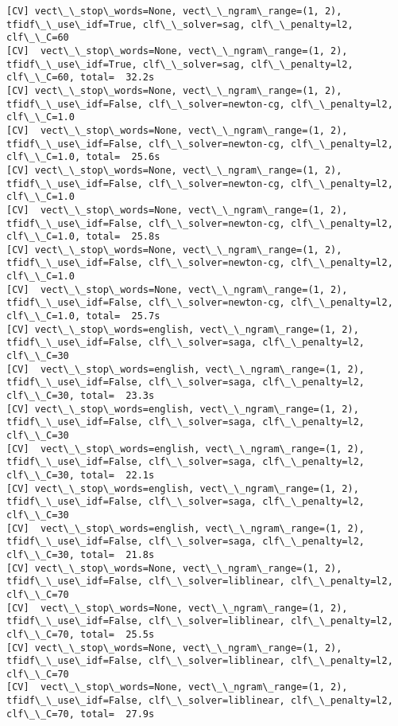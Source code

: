 \documentclass[11pt]{article}
\begin{document}
\begin{Verbatim}[commandchars=\\\{\}]
[CV] vect\_\_stop\_words=None, vect\_\_ngram\_range=(1, 2), tfidf\_\_use\_idf=True, clf\_\_solver=sag, clf\_\_penalty=l2, clf\_\_C=60 
[CV]  vect\_\_stop\_words=None, vect\_\_ngram\_range=(1, 2), tfidf\_\_use\_idf=True, clf\_\_solver=sag, clf\_\_penalty=l2, clf\_\_C=60, total=  32.2s
[CV] vect\_\_stop\_words=None, vect\_\_ngram\_range=(1, 2), tfidf\_\_use\_idf=False, clf\_\_solver=newton-cg, clf\_\_penalty=l2, clf\_\_C=1.0 
[CV]  vect\_\_stop\_words=None, vect\_\_ngram\_range=(1, 2), tfidf\_\_use\_idf=False, clf\_\_solver=newton-cg, clf\_\_penalty=l2, clf\_\_C=1.0, total=  25.6s
[CV] vect\_\_stop\_words=None, vect\_\_ngram\_range=(1, 2), tfidf\_\_use\_idf=False, clf\_\_solver=newton-cg, clf\_\_penalty=l2, clf\_\_C=1.0 
[CV]  vect\_\_stop\_words=None, vect\_\_ngram\_range=(1, 2), tfidf\_\_use\_idf=False, clf\_\_solver=newton-cg, clf\_\_penalty=l2, clf\_\_C=1.0, total=  25.8s
[CV] vect\_\_stop\_words=None, vect\_\_ngram\_range=(1, 2), tfidf\_\_use\_idf=False, clf\_\_solver=newton-cg, clf\_\_penalty=l2, clf\_\_C=1.0 
[CV]  vect\_\_stop\_words=None, vect\_\_ngram\_range=(1, 2), tfidf\_\_use\_idf=False, clf\_\_solver=newton-cg, clf\_\_penalty=l2, clf\_\_C=1.0, total=  25.7s
[CV] vect\_\_stop\_words=english, vect\_\_ngram\_range=(1, 2), tfidf\_\_use\_idf=False, clf\_\_solver=saga, clf\_\_penalty=l2, clf\_\_C=30 
[CV]  vect\_\_stop\_words=english, vect\_\_ngram\_range=(1, 2), tfidf\_\_use\_idf=False, clf\_\_solver=saga, clf\_\_penalty=l2, clf\_\_C=30, total=  23.3s
[CV] vect\_\_stop\_words=english, vect\_\_ngram\_range=(1, 2), tfidf\_\_use\_idf=False, clf\_\_solver=saga, clf\_\_penalty=l2, clf\_\_C=30 
[CV]  vect\_\_stop\_words=english, vect\_\_ngram\_range=(1, 2), tfidf\_\_use\_idf=False, clf\_\_solver=saga, clf\_\_penalty=l2, clf\_\_C=30, total=  22.1s
[CV] vect\_\_stop\_words=english, vect\_\_ngram\_range=(1, 2), tfidf\_\_use\_idf=False, clf\_\_solver=saga, clf\_\_penalty=l2, clf\_\_C=30 
[CV]  vect\_\_stop\_words=english, vect\_\_ngram\_range=(1, 2), tfidf\_\_use\_idf=False, clf\_\_solver=saga, clf\_\_penalty=l2, clf\_\_C=30, total=  21.8s
[CV] vect\_\_stop\_words=None, vect\_\_ngram\_range=(1, 2), tfidf\_\_use\_idf=False, clf\_\_solver=liblinear, clf\_\_penalty=l2, clf\_\_C=70 
[CV]  vect\_\_stop\_words=None, vect\_\_ngram\_range=(1, 2), tfidf\_\_use\_idf=False, clf\_\_solver=liblinear, clf\_\_penalty=l2, clf\_\_C=70, total=  25.5s
[CV] vect\_\_stop\_words=None, vect\_\_ngram\_range=(1, 2), tfidf\_\_use\_idf=False, clf\_\_solver=liblinear, clf\_\_penalty=l2, clf\_\_C=70 
[CV]  vect\_\_stop\_words=None, vect\_\_ngram\_range=(1, 2), tfidf\_\_use\_idf=False, clf\_\_solver=liblinear, clf\_\_penalty=l2, clf\_\_C=70, total=  27.9s

\end{Verbatim}
\end{document}
